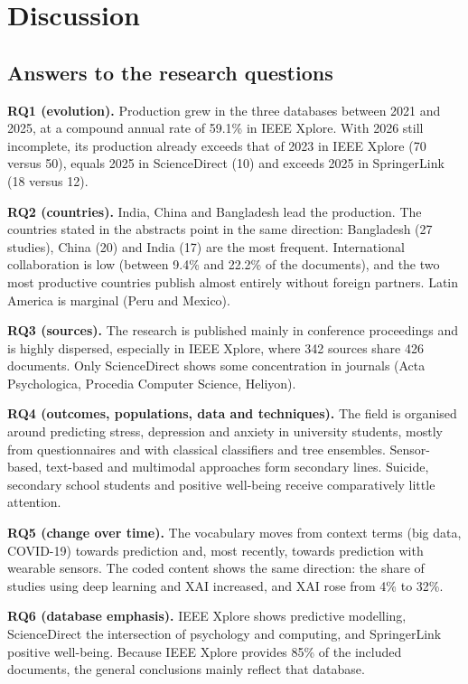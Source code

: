 \documentclass[11pt,a4paper]{article}
\begin{document}
\section{Discussion}\label{sec:discussion}

\subsection{Answers to the research questions}

\textbf{RQ1 (evolution).} Production grew in the three databases between 2021 and 2025, at a compound annual rate of 59.1\% in IEEE Xplore. With 2026 still incomplete, its production already exceeds that of 2023 in IEEE Xplore (70 versus 50), equals 2025 in ScienceDirect (10) and exceeds 2025 in SpringerLink (18 versus 12).

\textbf{RQ2 (countries).} India, China and Bangladesh lead the production. The countries stated in the abstracts point in the same direction: Bangladesh (27 studies), China (20) and India (17) are the most frequent. International collaboration is low (between 9.4\% and 22.2\% of the documents), and the two most productive countries publish almost entirely without foreign partners. Latin America is marginal (Peru and Mexico).

\textbf{RQ3 (sources).} The research is published mainly in conference proceedings and is highly dispersed, especially in IEEE Xplore, where 342 sources share 426 documents. Only ScienceDirect shows some concentration in journals (Acta Psychologica, Procedia Computer Science, Heliyon).

\textbf{RQ4 (outcomes, populations, data and techniques).} The field is organised around predicting stress, depression and anxiety in university students, mostly from questionnaires and with classical classifiers and tree ensembles. Sensor-based, text-based and multimodal approaches form secondary lines. Suicide, secondary school students and positive well-being receive comparatively little attention.

\textbf{RQ5 (change over time).} The vocabulary moves from context terms (big data, COVID-19) towards prediction and, most recently, towards prediction with wearable sensors. The coded content shows the same direction: the share of studies using deep learning and XAI increased, and XAI rose from 4\% to 32\%.

\textbf{RQ6 (database emphasis).} IEEE Xplore shows predictive modelling, ScienceDirect the intersection of psychology and computing, and SpringerLink positive well-being. Because IEEE Xplore provides 85\% of the included documents, the general conclusions mainly reflect that database.
\end{document}
